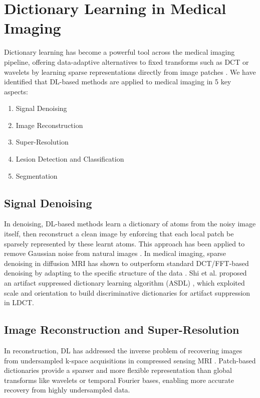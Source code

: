 \section{Dictionary Learning in Medical Imaging}

Dictionary learning has become a powerful tool across the medical imaging pipeline, offering data-adaptive
alternatives to fixed transforms such as DCT or wavelets by learning sparse representations directly from image patches \cite{tong2016dictionary}.
We have identified that DL-based methods are applied to medical imaging in 5 key aspects:

\begin{enumerate}
    \item Signal Denoising
    \item Image Reconstruction
    \item Super-Resolution
    \item Lesion Detection and Classification
    \item Segmentation
\end{enumerate}

\subsection{Signal Denoising}
In denoising, DL-based methods learn a dictionary of atoms from the noisy image itself, then reconstruct a
clean image by enforcing that each local patch be sparsely represented by these learnt atoms. This approach has been applied to
remove Gaussian noise from natural images \cite{elad2006image}. In medical imaging, sparse denoising in diffusion MRI
has shown to outperform standard DCT/FFT-based denoising by adapting to the specific structure of the data \cite{bao2013structure}.
Shi et al. proposed an artifact suppressed dictionary learning algorithm (ASDL) \cite{shi2014low}, which
exploited scale and orientation to build discriminative dictionaries for artifact suppression in LDCT.

\subsection{Image Reconstruction and Super-Resolution}

In reconstruction, DL has addressed the inverse problem of recovering images from undersampled k-space
acquisitions in compressed sensing MRI \cite{ravishankar2011mri}.
Patch-based dictionaries provide a sparser and more flexible representation than global transforms like
wavelets or temporal Fourier bases, enabling more accurate recovery from highly undersampled data.

